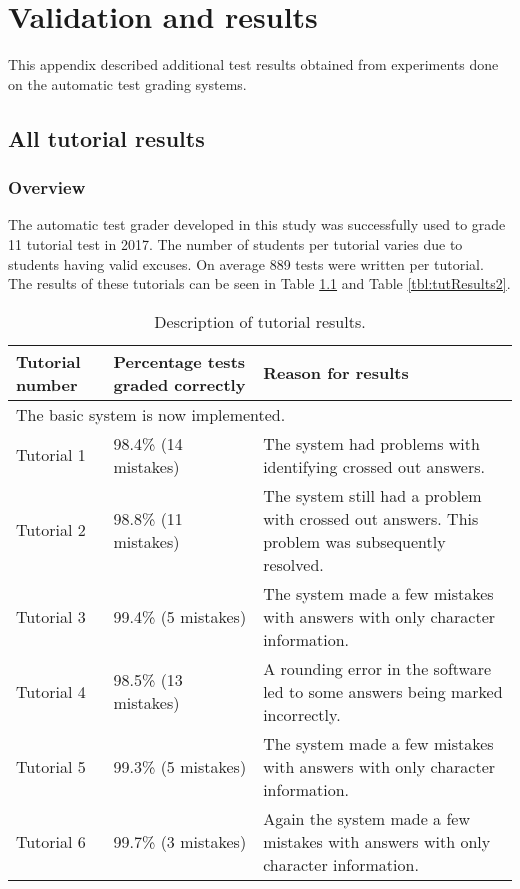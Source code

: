 \chapter{Validation and results}
\label{ap:results}
\graphicspath{{Appendix5/Appendix5figures/}}

This appendix described additional test results obtained from experiments done on the automatic test grading systems.

\section{All tutorial results}
\label{sec:tutorialResults}

\subsection{Overview}

The automatic test grader developed in this study was successfully used to grade 11 tutorial test in 2017. The number of students per tutorial varies due to students having valid excuses. On average 889 tests were written per tutorial. The results of these tutorials can be seen in Table \ref{tbl:tutResults} and Table \ref{tbl:tutResults2}.

\begin{table}
\caption{Description of tutorial results.} \label{tbl:tutResults}
  \centering
\begin{tabular}{|p{2cm}|p{4cm}|p{5cm}|}
\hline
\textbf{Tutorial number}&\textbf{Percentage tests graded correctly}&\textbf{Reason for results}\\
\hline
\multicolumn{3}{|l|}{The basic system is now implemented.}\\
\hline
Tutorial 1&98.4\% (14 mistakes)&The system had problems with identifying crossed out answers.\\
\hline
Tutorial 2&98.8\% (11 mistakes)&The system still had a problem with crossed out answers.  This problem was subsequently resolved.\\
\hline
Tutorial 3&99.4\% (5 mistakes)&The system made a few mistakes with answers with only character information.\\
\hline
Tutorial 4&98.5\% (13 mistakes)&A rounding error in the software led to some answers being marked incorrectly.\\
\hline
Tutorial 5&99.3\% (5 mistakes)&The system made a few mistakes with answers with only character information.\\
\hline
Tutorial 6&99.7\% (3 mistakes)&Again the system made a few mistakes with answers with only character information.\\
\hline
\end{tabular} 
\end{table}

